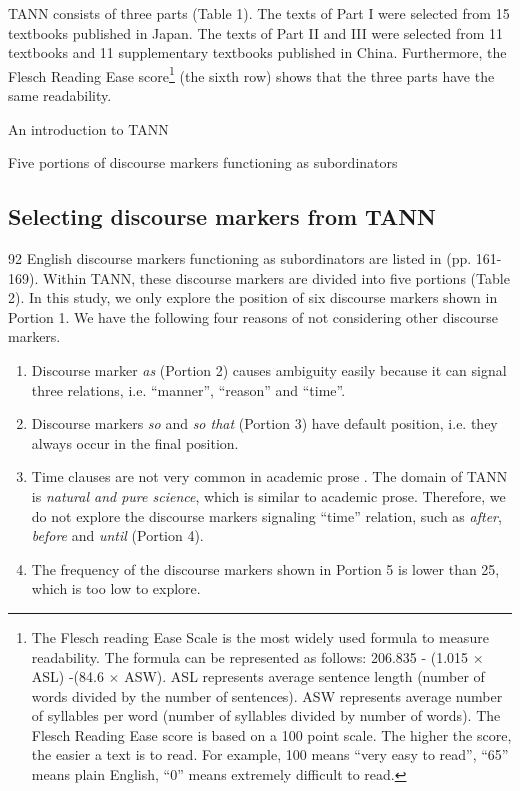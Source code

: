 \documentclass[english]{jnlp_1.3e}
\begin{document}
TANN consists of three parts (Table 1). The texts of Part I were selected 
from 15 textbooks published in Japan. The texts of Part II and III were 
selected from 11 textbooks and 11 supplementary textbooks published in China. 
Furthermore, the Flesch Reading Ease score\footnote{The Flesch reading Ease Scale is the most widely used formula to measure readability. The formula can be represented as follows: 206.835 - (1.015 $\times$ ASL) -(84.6 $\times$ ASW). ASL represents average sentence length (number of words divided by the number of sentences). ASW represents average number of syllables per word (number of syllables divided by number of words). The Flesch Reading Ease score is based on a 100 point scale. The higher the score, the easier a text is to read. For example, 100 means ``very easy to read'', ``65'' means plain English, ``0'' means extremely difficult to read.} (the sixth row) shows that the three parts have the same readability.  

\begin{table}[t]
 \caption{An introduction to TANN}

\end{table}

\begin{table}[b]
 \caption{Five portions of discourse markers functioning as subordinators}

\end{table}



\subsection{Selecting discourse markers from TANN}

92 English discourse markers functioning as subordinators are listed in \cite{Knott96} (pp. 161-169).
Within TANN, these discourse markers are divided into five portions (Table 2). 
In this study, we only explore the position of six discourse markers shown in Portion 1. 
We have the following four reasons of not considering other discourse markers. 

\begin{enumerate}
   \item Discourse marker \textit{as} (Portion 2) causes ambiguity
easily because it can signal three relations, i.e. ``manner'', ``reason'' and ``time''. 
   \item Discourse markers \textit{so} and \textit{so that} (Portion 3) have default position,
i.e. they always occur in the final position.
   \item Time clauses are not very common in academic prose \cite{Biber99}. 
The domain of TANN is \textit{natural and pure science}, which is similar to
academic prose. Therefore, we do not explore the discourse markers 
signaling ``time'' relation, such as \textit{after}, \textit{before} and 
\textit{until} (Portion 4).
   \item The frequency of the discourse markers shown in Portion 5 is 
lower than 25, which is too low to explore. 
\end{enumerate}
\end{document}
